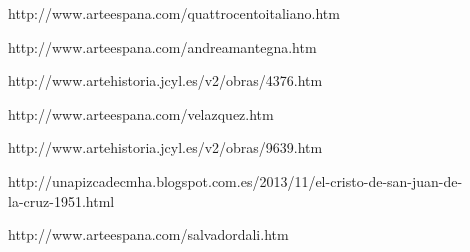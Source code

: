 \begin{description}
\item[] http://www.arteespana.com/quattrocentoitaliano.htm
\item[] http://www.arteespana.com/andreamantegna.htm
\item[] http://www.artehistoria.jcyl.es/v2/obras/4376.htm


\item[] http://www.arteespana.com/velazquez.htm

\item[] http://www.artehistoria.jcyl.es/v2/obras/9639.htm
\item[] http://unapizcadecmha.blogspot.com.es/2013/11/el-cristo-de-san-juan-de-la-cruz-1951.html
\item[] http://www.arteespana.com/salvadordali.htm





\end{description}